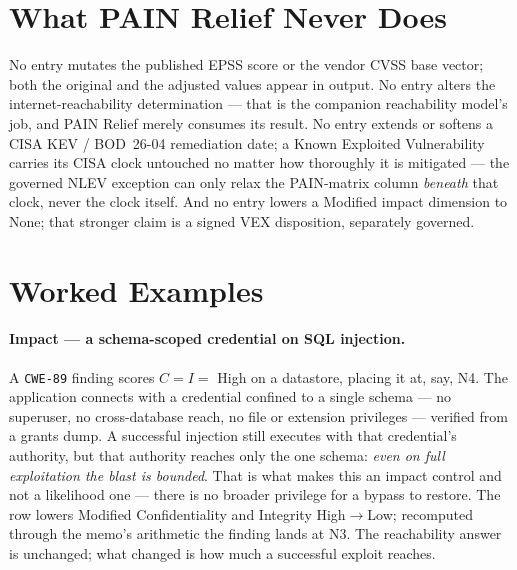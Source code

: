 \documentclass[11pt]{article}
\newcommand{\code}[1]{\texttt{#1}}
\begin{document}
\section{What PAIN Relief Never Does}
No entry mutates the published EPSS score or the vendor CVSS base vector; both the
original and the adjusted values appear in output. No entry alters the
internet-reachability determination --- that is the companion reachability
model's job, and PAIN Relief merely consumes its result. No entry extends or
softens a CISA KEV / BOD~26-04 remediation date; a Known Exploited Vulnerability
carries its CISA clock untouched no matter how thoroughly it is mitigated --- the
governed NLEV exception can only relax the PAIN-matrix column \emph{beneath} that
clock, never the clock itself. And no
entry lowers a Modified impact dimension to None; that stronger claim is a signed
VEX disposition, separately governed.

\section{Worked Examples}
\label{sec:examples}

\paragraph{Impact --- a schema-scoped credential on SQL injection.} A
\code{CWE-89} finding scores $C=I=$ High on a datastore, placing it at, say, N4.
The application connects with a credential confined to a single schema --- no
superuser, no cross-database reach, no file or extension privileges --- verified
from a grants dump. A successful injection still executes with that credential's
authority, but that authority reaches only the one schema: \emph{even on full
exploitation the blast is bounded}. That is what makes this an impact control and
not a likelihood one --- there is no broader privilege for a bypass to restore.
The row lowers Modified Confidentiality and Integrity High$\to$Low; recomputed
through the memo's arithmetic the finding lands at N3. The reachability answer is
unchanged; what changed is how much a successful exploit reaches.
\end{document}

